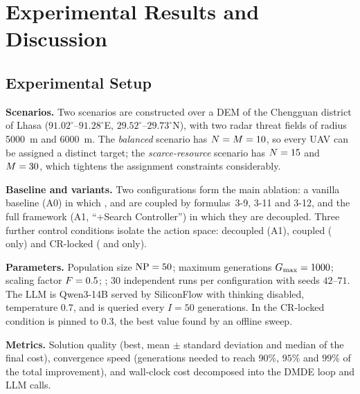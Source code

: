 
\section{Experimental Results and Discussion}
\label{sec:experiments}

\subsection{Experimental Setup}
\label{subsec:setup}

\textbf{Scenarios.} Two scenarios are constructed over a DEM of the Chengguan
district of Lhasa ($91.02^{\circ}$--$91.28^{\circ}$E,
$29.52^{\circ}$--$29.73^{\circ}$N), with two radar threat fields of radius
\SI{5000}{m} and \SI{6000}{m}. The \emph{balanced} scenario has
$N = M = 10$, so every UAV can be assigned a distinct target; the
\emph{scarce-resource} scenario has $N = 15$ and $M = 30$, which tightens the
assignment constraints considerably.

\textbf{Baseline and variants.} Two configurations form the main ablation:
a vanilla \dmde{} baseline (A0) in which \CR{}, \Ffactor{} and \GMR{} are
coupled by formulas~3-9, 3-11 and 3-12, and the full framework (A1,
``+Search Controller'') in which they are decoupled. Three further control
conditions isolate the action space: decoupled (A1), coupled (\CR{} only) and
CR-locked (\Ffactor{} and \GMR{} only).

\textbf{Parameters.} Population size $\mathrm{NP} = 50$; maximum generations
$G_{\max} = 1000$; scaling factor $F = 0.5$;
;
30 independent runs per configuration with seeds $42$--$71$. The LLM is
Qwen3-14B served by SiliconFlow with thinking disabled, temperature $0.7$, and
\searchctrl{} is queried every $I = 50$ generations. In the CR-locked condition
\CR{} is pinned to $0.3$, the best value found by an offline sweep.

\textbf{Metrics.} Solution quality (best, mean $\pm$ standard deviation and
median of the final cost), convergence speed (generations needed to reach $90\%$,
$95\%$ and $99\%$ of the total improvement), and wall-clock cost decomposed into
the DMDE loop and LLM calls.


